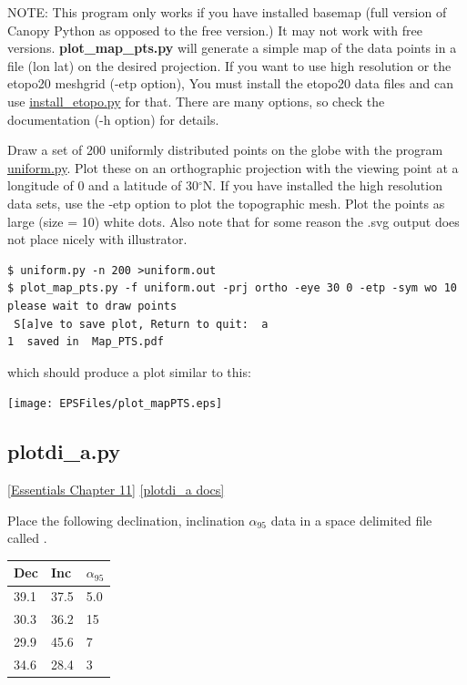 \documentclass[11pt]{book}
\begin{document}
{{{{NOTE:  This program only works if you have installed basemap (full version of Canopy Python as opposed to the free version.)  It may not work with  free versions.  {\bf plot\_map\_pts.py} will generate a simple map of the data points in a file (lon lat) on the desired projection.
If you want to use high resolution or the etopo20 meshgrid (-etp option), You must install the etopo20 data files and can use \href{#install_etopo.py}{install\_etopo.py}  for that.
 There are many options, so check the documentation (-h option) for details.

Draw a set of 200 uniformly distributed points on the globe with the program \href{#uniform.py}{uniform.py}.  Plot these on an orthographic projection with the viewing point at a longitude of 0 and a latitude of 30$^{\circ}$N.  If you have installed the high resolution data sets, use the -etp option to plot the topographic mesh.  Plot the points as large (size = 10) white dots.  Also note that for some reason the .svg output does not place nicely with illustrator.

\begin{verbatim}
$ uniform.py -n 200 >uniform.out
$ plot_map_pts.py -f uniform.out -prj ortho -eye 30 0 -etp -sym wo 10
please wait to draw points
 S[a]ve to save plot, Return to quit:  a
1  saved in  Map_PTS.pdf
\end{verbatim}

which should produce a plot similar to this:

\texttt{[image: EPSFiles/plot\_mapPTS.eps]}





\subsection{plotdi\_a.py}
\href{http://earthref.org/MAGIC/books/Tauxe/Essentials/WebBook3ch11.html#ch11}{[Essentials Chapter 11]}
\href{https://github.com/PmagPy/PmagPy/blob/master/programs/plotdi_a.py}{[plotdi\_a docs]}

Place the following declination, inclination $\alpha_{95}$ data in a space delimited file called .

\begin{tabular}{lll}
\hline
Dec\qquad &Inc\qquad &$\alpha_{95}$\\
\hline
39.1 \qquad & 37.5 \qquad & 5.0\\
30.3 \qquad & 36.2 \qquad & 15\\
29.9 \qquad & 45.6 \qquad & 7\\
34.6 \qquad & 28.4 \qquad & 3\\
\hline
\end{tabular}

}}}}
\end{document}
